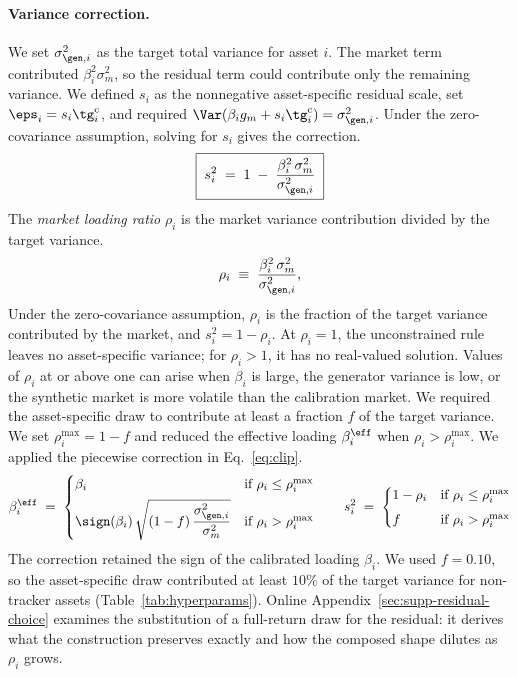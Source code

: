 \paragraph{Variance correction.}

We set $\sigma_{\gen,i}^2$ as the target total variance for asset $i$.
The market term contributed $\beta_i^2\sigma_m^2$, so the residual term
could contribute only the remaining variance. We defined $s_i$ as the
nonnegative asset-specific residual scale, set
$\eps_i=s_i\tg_i^{\mathrm c}$, and required
$\Var(\beta_i g_m+s_i\tg_i^{\mathrm c})=\sigma_{\gen,i}^2$. Under the
zero-covariance assumption, solving for $s_i$ gives the correction.
\begin{equation}
  \boxed{\;s_i^2 \;=\; 1 \;-\; \frac{\beta_i^2\, \sigma_m^2}{\sigma_{\gen,i}^2}\;}
  \label{eq:scale}
\end{equation}
The \emph{market loading ratio} $\rho_i$ is the market variance
contribution divided by the target variance.
\begin{equation}
  \rho_i \;\equiv\; \frac{\beta_i^2\, \sigma_m^2}{\sigma_{\gen,i}^2},
  \label{eq:rho}
\end{equation}
Under the zero-covariance assumption, $\rho_i$ is the fraction of the
target variance contributed by the market, and $s_i^2=1-\rho_i$. At
$\rho_i=1$, the unconstrained rule leaves no asset-specific variance;
for $\rho_i>1$, it has no real-valued solution. Values of $\rho_i$ at or
above one can arise when $\beta_i$ is large, the generator variance is low, or the
synthetic market is more volatile than the calibration market. We
required the asset-specific draw to contribute at least a fraction $f$
of the target variance. We set $\rho_i^{\max}=1-f$ and reduced the
effective loading $\beta_i^{\eff}$ when $\rho_i>\rho_i^{\max}$. We
applied the piecewise correction in Eq.~\eqref{eq:clip}.
\begin{equation}
  \beta_i^{\eff} \;=\;
  \begin{cases}
    \beta_i & \text{if } \rho_i \le \rho_i^{\max} \\[4pt]
    \sign(\beta_i)\,\sqrt{(1 - f)\,\dfrac{\sigma_{\gen,i}^2}{\sigma_m^2}} & \text{if } \rho_i > \rho_i^{\max}
  \end{cases}
  \qquad
  s_i^2 \;=\;
  \begin{cases}
    1 - \rho_i & \text{if } \rho_i \le \rho_i^{\max} \\[4pt]
    f          & \text{if } \rho_i > \rho_i^{\max}
  \end{cases}
  \label{eq:clip}
\end{equation}
The correction retained the sign of the calibrated loading $\beta_i$.
We used $f=0.10$, so the asset-specific draw contributed at least
$10\%$ of the target variance for non-tracker assets
(Table~\ref{tab:hyperparams}). Online
Appendix~\ref{sec:supp-residual-choice} examines the substitution of
a full-return draw for the residual: it derives what the construction
preserves exactly and how the composed shape dilutes as $\rho_i$
grows.

